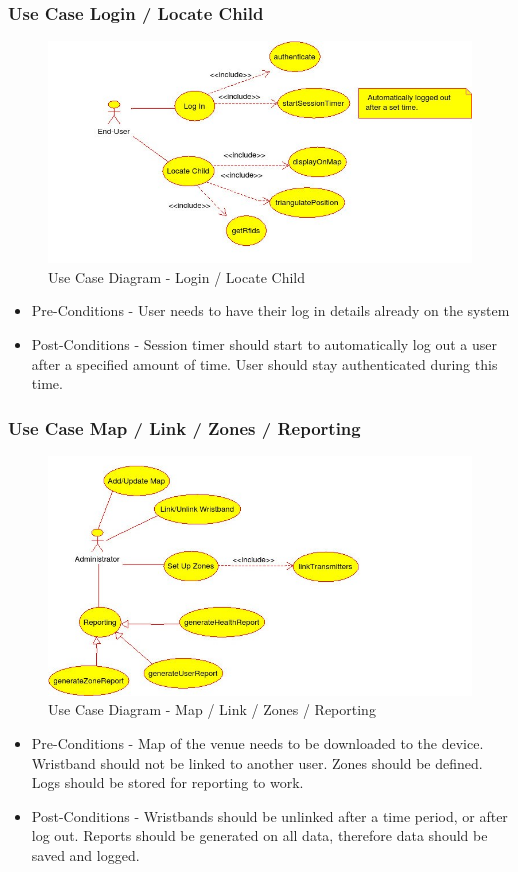 \documentclass[11pt,titlepage]{article} %
\begin{document}
	\subsubsection{Use Case Login / Locate Child}
\begin{figure}[H]
\centering
\includegraphics[scale = 0.8]{UseCase1.jpg}
\caption{Use Case Diagram - Login / Locate Child}
\end{figure}
\begin{itemize}
\item Pre-Conditions - User needs to have their log in details already on the system
\item Post-Conditions - Session timer should start to automatically log out a user after a specified amount of time. User should stay authenticated during this time. 
\end{itemize}
	
		\subsubsection{Use Case Map / Link / Zones / Reporting}
\begin{figure}[H]
\centering
\includegraphics[scale = 0.8]{UseCase2.jpg}
\caption{Use Case Diagram - Map / Link / Zones / Reporting}
\end{figure}
\begin{itemize}
\item Pre-Conditions - Map of the venue needs to be downloaded to the device. Wristband should not be linked to another user. Zones should be defined. Logs should be stored for reporting to work.
\item Post-Conditions - Wristbands should be unlinked after a time period, or after log out. Reports should be generated on all data, therefore data should be saved and logged. 
\end{itemize}
\end{document}

